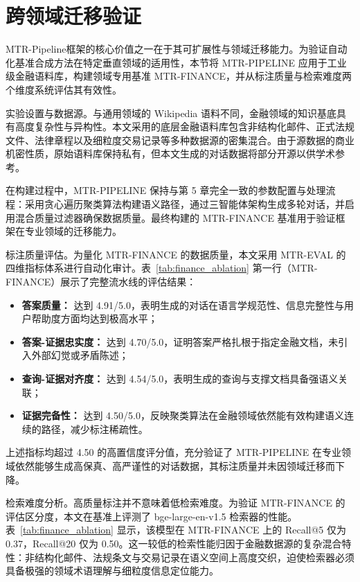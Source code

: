\section{跨领域迁移验证}
\label{sec:domain_transfer}

MTR-Pipeline框架的核心价值之一在于其可扩展性与领域迁移能力。为验证自动化基准合成方法在特定垂直领域的适用性，本节将 MTR-PIPELINE 应用于工业级金融语料库，构建领域专用基准 MTR-FINANCE，并从标注质量与检索难度两个维度系统评估其有效性。

实验设置与数据源。与通用领域的 Wikipedia 语料不同，金融领域的知识基底具有高度复杂性与异构性。本文采用的底层金融语料库包含非结构化邮件、正式法规文件、法律章程以及细粒度交易记录等多种数据源的密集混合。由于源数据的商业机密性质，原始语料库保持私有，但本文生成的对话数据将部分开源以供学术参考。

在构建过程中，MTR-PIPELINE 保持与第 5 章完全一致的参数配置与处理流程：采用贪心遍历聚类算法构建语义路径，通过三智能体架构生成多轮对话，并启用混合质量过滤器确保数据质量。最终构建的 MTR-FINANCE 基准用于验证框架在专业领域的迁移能力。

标注质量评估。为量化 MTR-FINANCE 的数据质量，本文采用 MTR-EVAL 的四维指标体系进行自动化审计。表~\ref{tab:finance_ablation} 第一行（MTR-FINANCE）展示了完整流水线的评估结果：
\begin{itemize}
    \item \textbf{答案质量：} 达到 4.91/5.0，表明生成的对话在语言学规范性、信息完整性与用户帮助度方面均达到极高水平；
    \item \textbf{答案-证据忠实度：} 达到 4.70/5.0，证明答案严格扎根于指定金融文档，未引入外部幻觉或矛盾陈述；
    \item \textbf{查询-证据对齐度：} 达到 4.54/5.0，表明生成的查询与支撑文档具备强语义关联；
    \item \textbf{证据完备性：} 达到 4.50/5.0，反映聚类算法在金融领域依然能有效构建语义连续的路径，减少标注稀疏性。
\end{itemize}

上述指标均超过 4.50 的高置信度评分值，充分验证了 MTR-PIPELINE 在专业领域依然能够生成高保真、高严谨性的对话数据，其标注质量并未因领域迁移而下降。

检索难度分析。高质量标注并不意味着低检索难度。为验证 MTR-FINANCE 的评估区分度，本文在基准上评测了 bge-large-en-v1.5 检索器的性能。表~\ref{tab:finance_ablation} 显示，该模型在 MTR-FINANCE 上的 Recall@5 仅为 0.37，Recall@20 仅为 0.50。这一较低的检索性能归因于金融数据源的复杂混合特性：非结构化邮件、法规条文与交易记录在语义空间上高度交织，迫使检索器必须具备极强的领域术语理解与细粒度信息定位能力。

